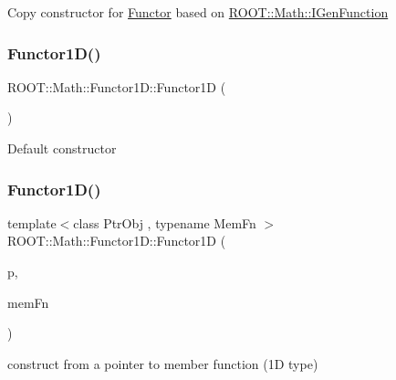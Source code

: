 Copy constructor for \mbox{\hyperlink{classROOT_1_1Math_1_1Functor}{Functor}} based on \mbox{\hyperlink{namespaceROOT_1_1Math_afe6400b4439b79d54c41fb9f5c5af171}{R\+O\+O\+T\+::\+Math\+::\+I\+Gen\+Function}} \mbox{\label{classROOT_1_1Math_1_1Functor1D_ad3e410215d5ac30310dedb841bf6a88f}} 
\subsubsection{\texorpdfstring{Functor1D()}{Functor1D()}\hspace{0.1cm}{\footnotesize\ttfamily [5/8]}}
{\footnotesize\ttfamily R\+O\+O\+T\+::\+Math\+::\+Functor1\+D\+::\+Functor1D (\begin{DoxyParamCaption}{ }\end{DoxyParamCaption})\hspace{0.3cm}{\ttfamily [inline]}}

Default constructor \mbox{\label{classROOT_1_1Math_1_1Functor1D_a6aee539fa2657228e99a1fc542f9ff9e}} 
\subsubsection{\texorpdfstring{Functor1D()}{Functor1D()}\hspace{0.1cm}{\footnotesize\ttfamily [6/8]}}
{\footnotesize\ttfamily template$<$class Ptr\+Obj , typename Mem\+Fn $>$ \\
R\+O\+O\+T\+::\+Math\+::\+Functor1\+D\+::\+Functor1D (\begin{DoxyParamCaption}\item[{const Ptr\+Obj \&}]{p,  }\item[{Mem\+Fn}]{mem\+Fn }\end{DoxyParamCaption})\hspace{0.3cm}{\ttfamily [inline]}}

construct from a pointer to member function (1D type) \mbox{\label{classROOT_1_1Math_1_1Functor1D_ac200eefbe8571f022f6b6a5d79fc7855}} 
